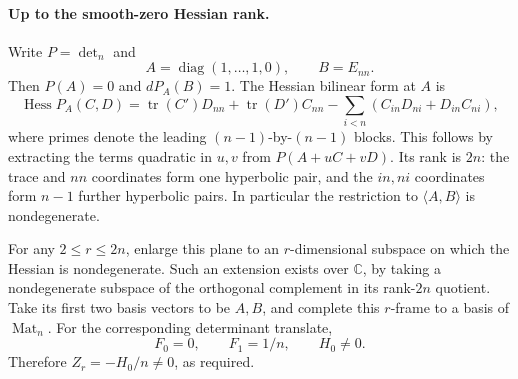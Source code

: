 \paragraph{Up to the smooth-zero Hessian rank.}
Write \(P=\det_n\) and
\[
 A=\operatorname{diag}(1,\ldots,1,0),\qquad B=E_{nn}.
\]
Then \(P(A)=0\) and \(dP_A(B)=1\).
The Hessian bilinear form at \(A\) is
\[
 \operatorname{Hess}P_A(C,D)
 =\operatorname{tr}(C')D_{nn}
       +\operatorname{tr}(D')C_{nn}
       -\sum_{i<n}(C_{in}D_{ni}+D_{in}C_{ni}),
                                                               \tag{A-035.5}
\]
where primes denote the leading \((n-1)\)-by-\((n-1)\)
blocks. This follows by extracting the terms quadratic
in \(u,v\) from \(P(A+uC+vD)\).
Its rank is \(2n\): the trace and \(nn\) coordinates
form one hyperbolic pair, and the \(in,ni\) coordinates
form \(n-1\) further hyperbolic pairs.
In particular the restriction to \(\langle A,B\rangle\)
is nondegenerate.

For any \(2\leq r\leq2n\), enlarge this plane to an
\(r\)-dimensional subspace on which the Hessian is
nondegenerate. Such an extension exists over
\(\mathbb C\), by taking a nondegenerate subspace of
the orthogonal complement in its rank-\(2n\) quotient.
Take its first two basis vectors to be \(A,B\), and
complete this \(r\)-frame to a basis of
\(\operatorname{Mat}_n\).
For the corresponding determinant translate,
\[
             F_0=0,\qquad F_1=1/n,\qquad H_0\ne0.
 \]
Therefore \(Z_r=-H_0/n\ne0\), as required.

